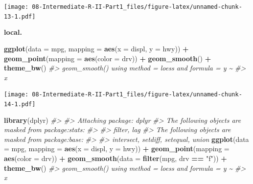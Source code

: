 \documentclass[
]{book}
\newenvironment{Shaded}{\begin{snugshade}}{\end{snugshade}}
\newcommand{\AttributeTok}[1]{\textcolor[rgb]{0.13,0.29,0.53}{#1}}
\newcommand{\CommentTok}[1]{\textcolor[rgb]{0.56,0.35,0.01}{\textit{#1}}}
\newcommand{\FunctionTok}[1]{\textcolor[rgb]{0.13,0.29,0.53}{\textbf{#1}}}
\newcommand{\NormalTok}[1]{#1}
\newcommand{\SpecialCharTok}[1]{\textcolor[rgb]{0.81,0.36,0.00}{\textbf{#1}}}
\newcommand{\StringTok}[1]{\textcolor[rgb]{0.31,0.60,0.02}{#1}}
\begin{document}
\texttt{[image: 08-Intermediate-R-II-Part1\_files/figure-latex/unnamed-chunk-13-1.pdf]}

\textbf{local.}

\begin{Shaded}
\begin{Highlighting}[]
\FunctionTok{ggplot}\NormalTok{(}\AttributeTok{data =}\NormalTok{ mpg, }\AttributeTok{mapping =} \FunctionTok{aes}\NormalTok{(}\AttributeTok{x =}\NormalTok{ displ, }\AttributeTok{y =}\NormalTok{ hwy)) }\SpecialCharTok{+}
  \FunctionTok{geom\_point}\NormalTok{(}\AttributeTok{mapping =} \FunctionTok{aes}\NormalTok{(}\AttributeTok{color =}\NormalTok{ drv)) }\SpecialCharTok{+}
  \FunctionTok{geom\_smooth}\NormalTok{() }\SpecialCharTok{+} \FunctionTok{theme\_bw}\NormalTok{()}
\CommentTok{\#\textgreater{} \textasciigrave{}geom\_smooth()\textasciigrave{} using method = \textquotesingle{}loess\textquotesingle{} and formula = \textquotesingle{}y \textasciitilde{}}
\CommentTok{\#\textgreater{} x\textquotesingle{}}
\end{Highlighting}
\end{Shaded}

\texttt{[image: 08-Intermediate-R-II-Part1\_files/figure-latex/unnamed-chunk-14-1.pdf]}

\begin{Shaded}
\begin{Highlighting}[]
\FunctionTok{library}\NormalTok{(dplyr)}
\CommentTok{\#\textgreater{} }
\CommentTok{\#\textgreater{} Attaching package: \textquotesingle{}dplyr\textquotesingle{}}
\CommentTok{\#\textgreater{} The following objects are masked from \textquotesingle{}package:stats\textquotesingle{}:}
\CommentTok{\#\textgreater{} }
\CommentTok{\#\textgreater{}     filter, lag}
\CommentTok{\#\textgreater{} The following objects are masked from \textquotesingle{}package:base\textquotesingle{}:}
\CommentTok{\#\textgreater{} }
\CommentTok{\#\textgreater{}     intersect, setdiff, setequal, union}
\FunctionTok{ggplot}\NormalTok{(}\AttributeTok{data =}\NormalTok{ mpg, }\AttributeTok{mapping =} \FunctionTok{aes}\NormalTok{(}\AttributeTok{x =}\NormalTok{ displ, }\AttributeTok{y =}\NormalTok{ hwy)) }\SpecialCharTok{+}
  \FunctionTok{geom\_point}\NormalTok{(}\AttributeTok{mapping =} \FunctionTok{aes}\NormalTok{(}\AttributeTok{color =}\NormalTok{ drv)) }\SpecialCharTok{+}
  \FunctionTok{geom\_smooth}\NormalTok{(}\AttributeTok{data =} \FunctionTok{filter}\NormalTok{(mpg, drv }\SpecialCharTok{==} \StringTok{"f"}\NormalTok{)) }\SpecialCharTok{+} \FunctionTok{theme\_bw}\NormalTok{()}
\CommentTok{\#\textgreater{} \textasciigrave{}geom\_smooth()\textasciigrave{} using method = \textquotesingle{}loess\textquotesingle{} and formula = \textquotesingle{}y \textasciitilde{}}
\CommentTok{\#\textgreater{} x\textquotesingle{}}
\end{Highlighting}
\end{Shaded}
\end{document}
